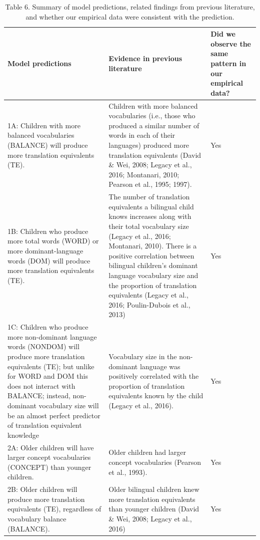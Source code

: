 \documentclass[
  english,
  ,man,floatsintext]{apa6}
\begin{document}
\begin{landscape}\begin{table}

\caption{\label{tab:table6}Table 6. Summary of model predictions, related findings from previous literature, and whether our empirical data were consistent with the prediction.}
\centering
\fontsize{7}{9}\selectfont
\begin{tabular}[t]{>{\raggedright\arraybackslash}p{200px}>{\raggedright\arraybackslash}p{250px}>{\centering\arraybackslash}p{150px}}
\toprule
Model predictions & Evidence in previous literature & Did we observe the same pattern in our empirical data?\\
\midrule
1A: Children with more balanced vocabularies (BALANCE) will produce more translation equivalents (TE). & Children with more balanced vocabularies (i.e., those who produced a similar number of words in each of their languages) produced more translation equivalents (David \& Wei, 2008; Legacy et al., 2016; Montanari, 2010; Pearson et al., 1995; 1997). & Yes\\
1B: Children who produce more total words (WORD) or more dominant-language words (DOM) will produce more translation equivalents (TE). & The number of translation equivalents a bilingual child knows increases along with their total vocabulary size (Legacy et al., 2016; Montanari, 2010). 
 There is a positive correlation between bilingual children’s dominant language vocabulary size and the proportion of translation equivalents (Legacy et al., 2016; Poulin-Dubois et al., 2013) & Yes\\
1C: Children who produce more non-dominant language words (NONDOM) will produce more translation equivalents (TE); but unlike for WORD and DOM this does not interact with BALANCE; instead, non-dominant vocabulary size will be an almost perfect predictor of translation equivalent knowledge & Vocabulary size in the non-dominant language was positively correlated with the proportion of translation equivalents known by the child (Legacy et al., 2016). & Yes\\
2A: Older children will have larger concept vocabularies (CONCEPT) than younger children. & Older children had larger concept vocabularies (Pearson et al., 1993). & Yes\\
2B: Older children will produce more translation equivalents (TE), regardless of vocabulary balance (BALANCE). & Older bilingual children knew more translation equivalents than younger children  (David \& Wei, 2008; Legacy et al., 2016) & Yes\\

\end{tabular}
\end{table}
\end{landscape}
\end{document}

